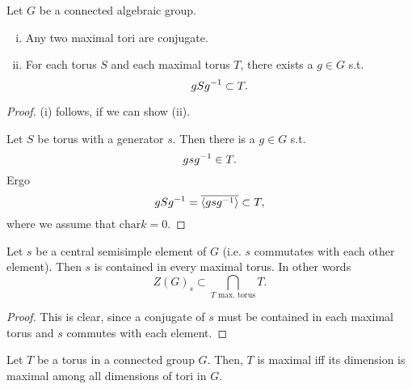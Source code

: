 \begin{corollary}
	Let $G$ be a connected algebraic group.
	\begin{enumerate}[(i)]
		\item Any two maximal tori are conjugate.
		\item For each torus $S$ and each maximal torus $T$, there exists a $g \in G$ s.t.
		\[ gSg^{-1} \subset T. \]
	\end{enumerate}
\end{corollary}
\begin{proof}
	(i) follows, if we can show (ii).
	
	Let $S$ be torus with a generator $s$. Then there is a $g \in G$ s.t.
	\[ gsg^{-1} \in T. \]
	Ergo
	\[ gSg^{-1} = \overline{\left<gsg^{-1}\right>} \subset T, \]
	where we assume that $\mathrm{char} k = 0$.
\end{proof}

\begin{corollary}
	Let $s$ be a central semisimple element of $G$ (i.e. $s$ commutates with each other element). Then $s$ is contained in every maximal torus. In other words
	\[ Z(G)_s \subset \bigcap_{T \text{ max. torus}}T. \]
\end{corollary}
\begin{proof}
This is clear, since a conjugate of $s$ must be contained in each maximal torus and $s$ commutes with each element.
\end{proof}
\begin{corollary}
	Let $T$ be a torus in a connected group $G$.
	Then, $T$ is maximal iff its dimension is maximal among all dimensions of tori in $G$.
\end{corollary}